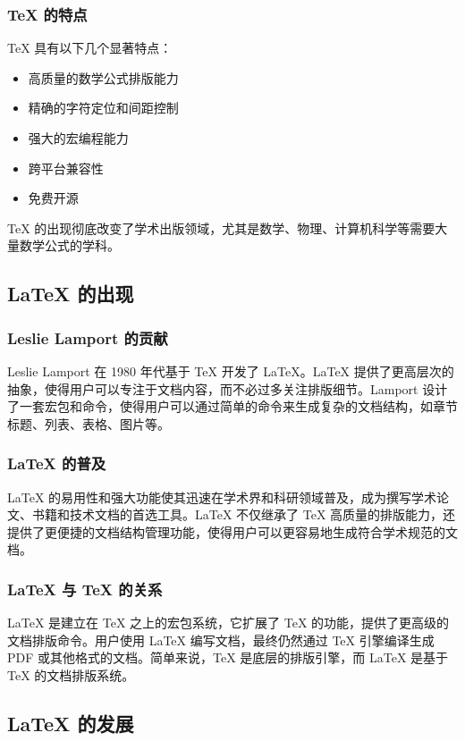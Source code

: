 \documentclass[UTF8,AutoFakeBold=1,AutoFakeSlant,zihao=-4]{SCAU}
\begin{document}
\subsubsection{TeX 的特点}
TeX 具有以下几个显著特点：
\begin{itemize}
    \item 高质量的数学公式排版能力
    \item 精确的字符定位和间距控制
    \item 强大的宏编程能力
    \item 跨平台兼容性
    \item 免费开源
\end{itemize}

TeX 的出现彻底改变了学术出版领域，尤其是数学、物理、计算机科学等需要大量数学公式的学科。

\subsection{LaTeX 的出现}
\subsubsection{Leslie Lamport 的贡献}
Leslie Lamport 在 1980 年代基于 TeX 开发了 LaTeX。LaTeX 提供了更高层次的抽象，使得用户可以专注于文档内容，而不必过多关注排版细节。Lamport 设计了一套宏包和命令，使得用户可以通过简单的命令来生成复杂的文档结构，如章节标题、列表、表格、图片等。

\subsubsection{LaTeX 的普及}
LaTeX 的易用性和强大功能使其迅速在学术界和科研领域普及，成为撰写学术论文、书籍和技术文档的首选工具。LaTeX 不仅继承了 TeX 高质量的排版能力，还提供了更便捷的文档结构管理功能，使得用户可以更容易地生成符合学术规范的文档。

\subsubsection{LaTeX 与 TeX 的关系}
LaTeX 是建立在 TeX 之上的宏包系统，它扩展了 TeX 的功能，提供了更高级的文档排版命令。用户使用 LaTeX 编写文档，最终仍然通过 TeX 引擎编译生成 PDF 或其他格式的文档。简单来说，TeX 是底层的排版引擎，而 LaTeX 是基于 TeX 的文档排版系统。

\subsection{LaTeX 的发展}
\end{document}
